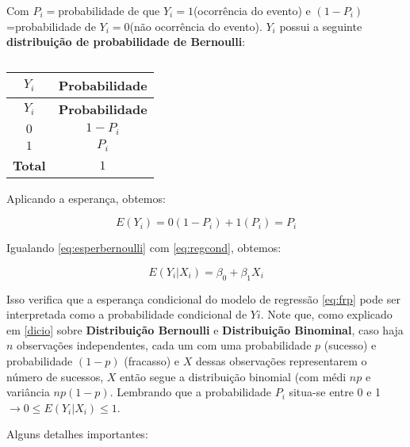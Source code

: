 \documentclass[
  openany]{book}
\begin{document}
Com \(P_i=\)probabilidade de que \(Y_i=1\)(ocorrência do evento) e \((1-P_i)\)=probabilidade de \(Y_i=0\)(não ocorrência do evento). \(Y_i\) possui a seguinte \textbf{distribuição de probabilidade de Bernoulli}:

\begin{longtable}[]{@{}cc@{}}
\caption{\label{tab:bernoulireg}}\tabularnewline
\toprule
\textbf{\(Y_i\)} & \textbf{Probabilidade}\tabularnewline
\midrule
\endfirsthead
\toprule
\textbf{\(Y_i\)} & \textbf{Probabilidade}\tabularnewline
\midrule
\endhead
\(0\) & \(1-P_i\)\tabularnewline
\(1\) & \(P_i\)\tabularnewline
\textbf{Total} & \(1\)\tabularnewline
\bottomrule
\end{longtable}

Aplicando a esperança, obtemos:

\begin{equation}
    E(Y_i)=0(1-P_i)+1(P_i)=P_i
    \label{eq:esperbernoulli}
\end{equation}

Igualando \eqref{eq:esperbernoulli} com \eqref{eq:regcond}, obtemos:

\begin{equation}
    E(Y_i|X_i)=\beta_0+\beta_1 X_i
    \label{eq:regprob}
\end{equation}

Isso verifica que a esperança condicional do modelo de regressão \eqref{eq:frp} pode ser interpretada como a probabilidade
condicional de \(Yi\). Note que, como explicado em \ref{dicio} sobre \textbf{Distribuição Bernoulli} e \textbf{Distribuição Binominal}, caso haja \(n\) observações independentes, cada um com uma probabilidade \(p\) (sucesso) e probabilidade \((1 - p)\) (fracasso) e \(X\) dessas observações representarem o número de sucessos, \(X\) então segue a distribuição binomial (com médi \(np\) e variância \(np(1-p)\). Lembrando que a probabilidade \(P_i\) situa-se entre 0 e 1 \(\rightarrow 0 \leq E(Y_i|X_i) \leq 1\).

Alguns detalhes importantes:
\end{document}
